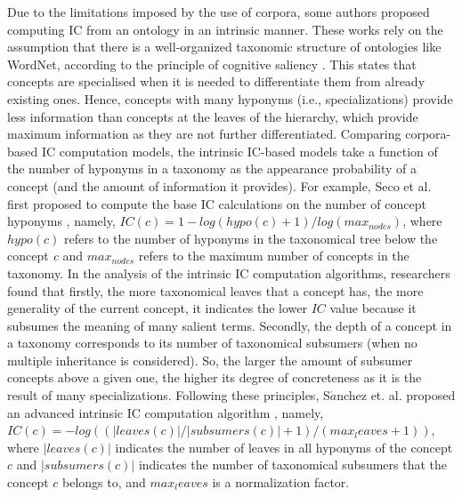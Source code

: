 Due to the limitations imposed by the use of corpora, some authors proposed computing IC from an ontology in an
intrinsic manner\cite{Seco:2004}. These works rely on the assumption that
there is a well-organized taxonomic structure of ontologies like WordNet, according to the principle of cognitive saliency
\cite{Blank:2001}. This states that concepts are specialised when it is needed to
differentiate them from already existing ones. Hence, concepts with
many hyponyms (i.e., specializations) provide less information
than concepts at the leaves of the hierarchy, which provide maximum
information as they are not further differentiated. Comparing corpora-based IC computation models, the intrinsic IC-based models take a function of the
number of hyponyms in a taxonomy as the appearance probability of a concept (and the amount of information it provides). For example, Seco et al. first proposed to compute the base IC calculations on the number
of concept hyponyms \cite{Seco:2004}, namely, $IC(c) = 1-log(hypo(c)+1)/log(max_{nodes})$, where $hypo(c)$ refers to the number of hyponyms in the taxonomical tree below the concept \emph{c} and $max_{nodes}$ refers to the maximum number of concepts in the taxonomy. In the analysis of the intrinsic IC computation algorithms, researchers found that firstly, the more taxonomical leaves that a concept has, the more generality of the current concept, it indicates the lower $IC$ value because it subsumes the meaning of
many salient terms. Secondly, the depth of a concept in a taxonomy
corresponds to its number of taxonomical subsumers (when no multiple inheritance is considered). So, the larger the amount of subsumer concepts above a given one, the higher its
degree of concreteness as it is the result of many specializations.
Following these principles, S$\acute{a}$nchez et. al. proposed an advanced intrinsic IC computation algorithm \cite{Snchez:2011}, namely, $IC(c) = -log((|leaves(c)|/|subsumers(c)|+1)/(max_leaves+1))$, where $|leaves(c)|$ indicates the number of leaves in all hyponyms of the concept $c$ and $|subsumers(c)|$ indicates the number of taxonomical subsumers that the concept $c$ belongs to, and $max_leaves$ is a normalization factor.

